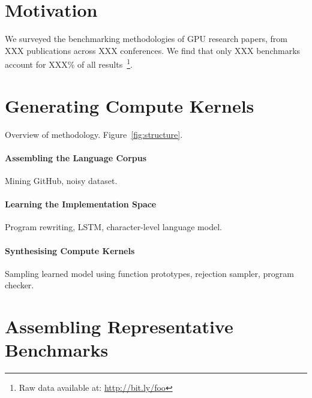 \documentclass[preprint,nonatbib,10pt,nocopyrightspace]{sigplanconf}
\begin{document}
\section{Motivation}\label{sec:motivation}

We surveyed the benchmarking methodologies of GPU research papers,
from XXX publications across XXX conferences. We find that only XXX
benchmarks account for XXX\% of all results~\footnote{Raw data
  available at: \url{http://bit.ly/foo}}.
%

\section{Generating Compute Kernels}\label{sec:}

Overview of methodology. Figure~\ref{fig:structure}.

\paragraph{Assembling the Language Corpus} Mining GitHub, noisy
dataset.


\paragraph{Learning the Implementation Space} Program rewriting, LSTM,
character-level language model.


\paragraph{Synthesising Compute Kernels} Sampling learned model using
function prototypes, rejection sampler, program checker.


\begin{figure*}[t]
  \centering
  
  \caption{%
    The kernel synthesis pipeline.%
  }
\label{fig:structure}
\end{figure*}


\section{Assembling Representative Benchmarks}\label{sec:}
\end{document}
